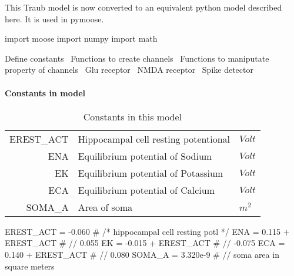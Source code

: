 \documentclass[]{article}%
\begin{document}
 This Traub model is now converted to an equivalent python model described here.
 It is used in {\Tt{}pymoose\nwendquote}.


\nwenddocs{}\endmoddef\nwstartdeflinemarkup\nwenddeflinemarkup
import moose
import numpy
import math

\LA{}Define constants~{\nwtagstyle{}}\RA{}
\LA{}Functions to create channels~{\nwtagstyle{}}\RA{}
\LA{}Functions to maniputate property of channels~{\nwtagstyle{}}\RA{}
\LA{}Glu receptor~{\nwtagstyle{}}\RA{}
\LA{}NMDA receptor~{\nwtagstyle{}}\RA{}
\LA{}Spike detector~{\nwtagstyle{}}\RA{}
\eatline
{}\nwendcode{}\nwdocspar
\paragraph{Constants in model}

  \begin{table}[h]
    \centering
    \begin{tabular}{rll}
    \hline
    EREST\_ACT & Hippocampal cell resting potentional & $Volt$ \\
    ENA        & Equilibrium potential of Sodium      & $Volt$ \\
    EK         & Equilibrium potential of Potassium   & $Volt$ \\
    ECA        & Equilibrium potential of Calcium     & $Volt$ \\
    SOMA\_A    & Area of soma                         & $m^2$ \\
    \hline
    \end{tabular}
    \caption{Constants in this model}
  \end{table}

\nwenddocs{}\endmoddef\nwstartdeflinemarkup{}\nwenddeflinemarkup
EREST_ACT = -0.060      # /* hippocampal cell resting potl */
ENA = 0.115 + EREST_ACT # // 0.055
EK = -0.015 + EREST_ACT # // -0.075
ECA = 0.140 + EREST_ACT # // 0.080
SOMA_A = 3.320e-9       # // soma area in square meters
\eatline
{}\nwendcode{}\nwdocspar
\end{document}
